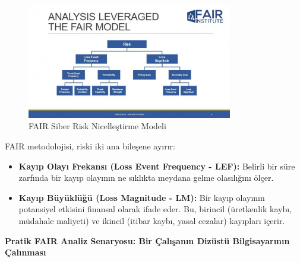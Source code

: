 \begin{figure}[H]
    \centering
    \includegraphics[width=0.8\textwidth]{img/FAIR-Cyber-Risk-Quantification-model.png}
    \caption{FAIR Siber Risk Nicelleştirme Modeli}
    \label{fig:fair-risk-model}
\end{figure}

FAIR metodolojisi, riski iki ana bileşene ayırır:
\begin{itemize}
    \item \textbf{Kayıp Olayı Frekansı (Loss Event Frequency - LEF):} Belirli bir süre zarfında bir kayıp olayının ne sıklıkta meydana gelme olasılığını ölçer.
    \item \textbf{Kayıp Büyüklüğü (Loss Magnitude - LM):} Bir kayıp olayının potansiyel etkisini finansal olarak ifade eder. Bu, birincil (üretkenlik kaybı, müdahale maliyeti) ve ikincil (itibar kaybı, yasal cezalar) kayıpları içerir.
\end{itemize}

\textbf{Pratik FAIR Analiz Senaryosu: Bir Çalışanın Dizüstü Bilgisayarının Çalınması}

